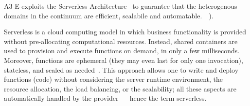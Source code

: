 


A3-E exploits the Serverless Architecture~\cite{baldini2017serverless} to guarantee that the heterogenous domains in the continuum are efficient, scalabile and automatable.~\cite{GarrigaMendonca2017}~\cite{Hendrickson:2016}).

Serverless is a cloud computing model in which business functionality is provided without pre-allocating computational resources. Instead, shared containers are used to provision and execute functions on demand, in only a few milliseconds. Moreover, functions are ephemeral (they may even last for only one invocation), stateless, and scaled as needed~\cite{Roberts:2016}. This approach allows one to write and deploy functions (code) without considering the server runtime environment, the resource allocation, the load balancing, or the scalability; all these aspects are automatically handled by the provider --- hence the term serverless.



